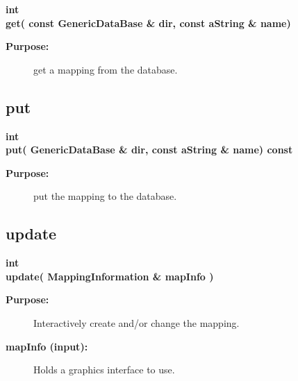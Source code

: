 \begin{flushleft} \textbf{%
int  \\ 
\settowidth{\IntersectionMappingIncludeArgIndent}{get(}%
get( const GenericDataBase \& dir, const aString \& name)
}\end{flushleft}
\begin{description}
\item[{\bf Purpose:}]  get a mapping from the database.
\end{description}
\subsection{put}
 
\begin{flushleft} \textbf{%
int  \\ 
\settowidth{\IntersectionMappingIncludeArgIndent}{put(}%
put( GenericDataBase \& dir, const aString \& name) const
}\end{flushleft}
\begin{description}
\item[{\bf Purpose:}]  put the mapping to the database.
\end{description}
\subsection{update}
 
\begin{flushleft} \textbf{%
int  \\ 
\settowidth{\IntersectionMappingIncludeArgIndent}{update(}%
update( MappingInformation \& mapInfo ) 
}\end{flushleft}
\begin{description}
\item[{\bf Purpose:}]  Interactively create and/or change the mapping.
\item[{\bf mapInfo (input):}]  Holds a graphics interface to use.
\end{description}
